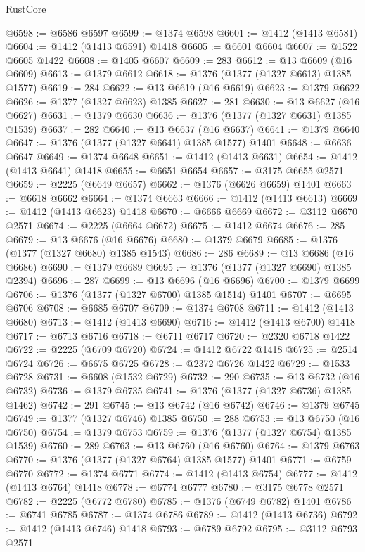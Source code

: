 \begin{lexlean}{RustCore}
\begin{coremodule}
@6598 := @6586 @6597
@6599 := @1374 @6598
@6601 := @1412 (@1413 @6581)
@6604 := @1412 (@1413 @6591) @1418
@6605 := @6601 @6604
@6607 := @1522 @6605 @1422
@6608 := @1405 @6607
@6609 := 283
@6612 := @13 @6609 (@16 @6609)
@6613 := @1379 @6612
@6618 := @1376 (@1377 (@1327 @6613) @1385 @1577)
@6619 := 284
@6622 := @13 @6619 (@16 @6619)
@6623 := @1379 @6622
@6626 := @1377 (@1327 @6623) @1385
@6627 := 281
@6630 := @13 @6627 (@16 @6627)
@6631 := @1379 @6630
@6636 := @1376 (@1377 (@1327 @6631) @1385 @1539)
@6637 := 282
@6640 := @13 @6637 (@16 @6637)
@6641 := @1379 @6640
@6647 := @1376 (@1377 (@1327 @6641) @1385 @1577) @1401
@6648 := @6636 @6647
@6649 := @1374 @6648
@6651 := @1412 (@1413 @6631)
@6654 := @1412 (@1413 @6641) @1418
@6655 := @6651 @6654
@6657 := @3175 @6655 @2571
@6659 := @2225 (@6649 @6657)
@6662 := @1376 (@6626 @6659) @1401
@6663 := @6618 @6662
@6664 := @1374 @6663
@6666 := @1412 (@1413 @6613)
@6669 := @1412 (@1413 @6623) @1418
@6670 := @6666 @6669
@6672 := @3112 @6670 @2571
@6674 := @2225 (@6664 @6672)
@6675 := @1412 @6674
@6676 := 285
@6679 := @13 @6676 (@16 @6676)
@6680 := @1379 @6679
@6685 := @1376 (@1377 (@1327 @6680) @1385 @1543)
@6686 := 286
@6689 := @13 @6686 (@16 @6686)
@6690 := @1379 @6689
@6695 := @1376 (@1377 (@1327 @6690) @1385 @2394)
@6696 := 287
@6699 := @13 @6696 (@16 @6696)
@6700 := @1379 @6699
@6706 := @1376 (@1377 (@1327 @6700) @1385 @1514) @1401
@6707 := @6695 @6706
@6708 := @6685 @6707
@6709 := @1374 @6708
@6711 := @1412 (@1413 @6680)
@6713 := @1412 (@1413 @6690)
@6716 := @1412 (@1413 @6700) @1418
@6717 := @6713 @6716
@6718 := @6711 @6717
@6720 := @2320 @6718 @1422
@6722 := @2225 (@6709 @6720)
@6724 := @1412 @6722 @1418
@6725 := @2514 @6724
@6726 := @6675 @6725
@6728 := @2372 @6726 @1422
@6729 := @1533 @6728
@6731 := @6608 (@1532 @6729)
@6732 := 290
@6735 := @13 @6732 (@16 @6732)
@6736 := @1379 @6735
@6741 := @1376 (@1377 (@1327 @6736) @1385 @1462)
@6742 := 291
@6745 := @13 @6742 (@16 @6742)
@6746 := @1379 @6745
@6749 := @1377 (@1327 @6746) @1385
@6750 := 288
@6753 := @13 @6750 (@16 @6750)
@6754 := @1379 @6753
@6759 := @1376 (@1377 (@1327 @6754) @1385 @1539)
@6760 := 289
@6763 := @13 @6760 (@16 @6760)
@6764 := @1379 @6763
@6770 := @1376 (@1377 (@1327 @6764) @1385 @1577) @1401
@6771 := @6759 @6770
@6772 := @1374 @6771
@6774 := @1412 (@1413 @6754)
@6777 := @1412 (@1413 @6764) @1418
@6778 := @6774 @6777
@6780 := @3175 @6778 @2571
@6782 := @2225 (@6772 @6780)
@6785 := @1376 (@6749 @6782) @1401
@6786 := @6741 @6785
@6787 := @1374 @6786
@6789 := @1412 (@1413 @6736)
@6792 := @1412 (@1413 @6746) @1418
@6793 := @6789 @6792
@6795 := @3112 @6793 @2571

\end{coremodule}
\end{lexlean}

